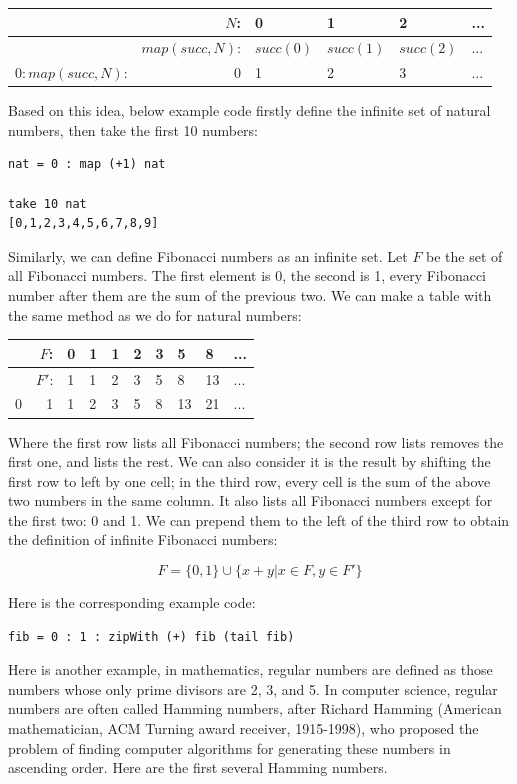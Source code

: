 \documentclass{article}
\begin{document}
\begin{tabular}{|r|r|l|l|l|l|}
\hline
                 & $N$: & 0 & 1 & 2 & ... \\
\hline
                 & $map(succ, N)$: & $succ(0)$ & $succ(1)$ & $succ(2)$ & ... \\
\hline
$0 : map(succ, N)$: & 0 & 1 & 2 & 3 & ... \\
\hline
\end{tabular}

Based on this idea, below example code firstly define the infinite set of natural numbers, then take the first 10 numbers:

\lstset{frame=single}
\begin{lstlisting}
nat = 0 : map (+1) nat

take 10 nat
[0,1,2,3,4,5,6,7,8,9]
\end{lstlisting}

Similarly, we can define Fibonacci numbers as an infinite set. Let $F$ be the set of all Fibonacci numbers. The first element is 0, the second is 1, every Fibonacci number after them are the sum of the previous two. We can make a table with the same method as we do for natural numbers:

\begin{tabular}{|r|r|l|l|l|l|l|l|l|l|}
\hline
  & $F$:  & 0 & 1 & 1 & 2 & 3 & 5 & 8 & ... \\
\hline
  & $F'$: & 1 & 1 & 2 & 3 & 5 & 8 & 13 & ... \\
\hline
0 & 1     & 1 & 2 & 3 & 5 & 8 & 13 & 21 & ... \\
\hline
\end{tabular}

Where the first row lists all Fibonacci numbers; the second row lists removes the first one, and lists the rest. We can also consider it is the result by shifting the first row to left by one cell; in the third row, every cell is the sum of the above two numbers in the same column. It also lists all Fibonacci numbers except for the first two: 0 and 1. We can prepend them to the left of the third row to obtain the definition of infinite Fibonacci numbers:

\[
F = \{0, 1\} \cup \{ x + y | x \in F, y \in F'\}
\]

Here is the corresponding example code:
\begin{lstlisting}
fib = 0 : 1 : zipWith (+) fib (tail fib)
\end{lstlisting}

 
Here is another example, in mathematics, regular numbers are defined as those numbers whose only prime divisors are 2, 3, and 5. In computer science, regular numbers are often called Hamming numbers, after Richard Hamming (American mathematician, ACM Turning award receiver, 1915-1998), who proposed the problem of finding computer algorithms for generating these numbers in ascending order. Here are the first several Hamming numbers.
\end{document}
